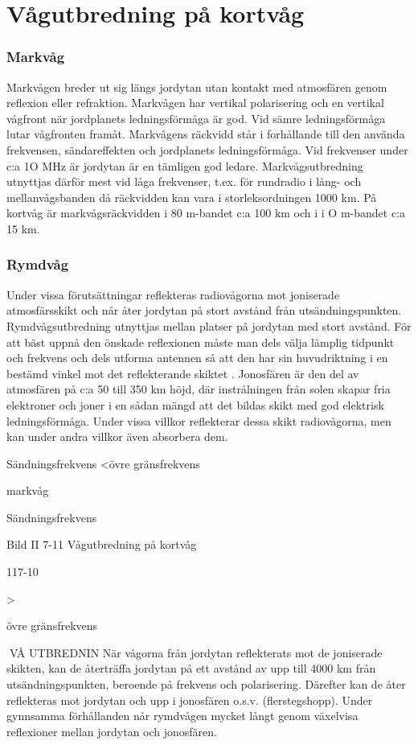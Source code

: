 \section{Vågutbredning på kortvåg}

\subsubsection{Markvåg}

Markvågen breder ut sig längs jordytan utan
kontakt med atmosfären genom reflexion
eller refraktion.
Markvågen har vertikal polarisering och
en vertikal vågfront när jordplanets ledningsförmåga är god. Vid sämre ledningsförmåga
lutar vågfronten framåt.
Markvågens räckvidd står i forhållande
till den använda frekvensen, sändareffekten
och jordplanets ledningsförmåga.
Vid frekvenser under c:a 1O MHz är jordytan är en tämligen god ledare. Markvågsutbredning utnyttjas därför mest vid låga
frekvenser, t.ex. för rundradio i lång- och
mellanvågsbanden då räckvidden kan vara
i storleksordningen 1000 km. På kortvåg är
markvågsräckvidden i 80 m-bandet c:a 100
km och i i O m-bandet c:a 15 km.

\subsubsection{Rymdvåg}
Under vissa förutsättningar reflekteras radiovågorna mot joniserade atmosfärsskikt
och når åter jordytan på stort avstånd från
utsändningspunkten. Rymdvågsutbredning
utnyttjas mellan platser på jordytan med stort
avstånd.
För att bäst uppnå den önskade reflexionen måste man dels välja lämplig tidpunkt
och frekvens och dels utforma antennen så
att den har sin huvudriktning i en bestämd
vinkel mot det reflekterande skiktet .
Jonosfären är den del av atmosfären på
c:a 50 till 350 km höjd, där instrålningen från
solen skapar fria elektroner och joner i en
sådan mängd att det bildas skikt med god
elektrisk ledningsförmåga. Under vissa villkor reflekterar dessa skikt radiovågorna, men
kan under andra villkor även absorbera dem.

Sändningsfrekvens <övre gränsfrekvens

markvåg

Sändningsfrekvens

Bild II 7-11 Vågutbredning på kortvåg

117-10

>

övre gränsfrekvens

VÅ UTBREDNIN
När vågorna från jordytan reflekterats
mot de joniserade skikten, kan de återträffa
jordytan på ett avstånd av upp till 4000 km
från utsändningspunkten, beroende på frekvens och polarisering. Därefter kan de åter
reflekteras mot jordytan och upp i jonosfären o.s.v. (flerstegshopp). Under gynnsamma förhållanden når rymdvågen mycket
långt genom växelvisa reflexioner mellan
jordytan och jonosfären.

